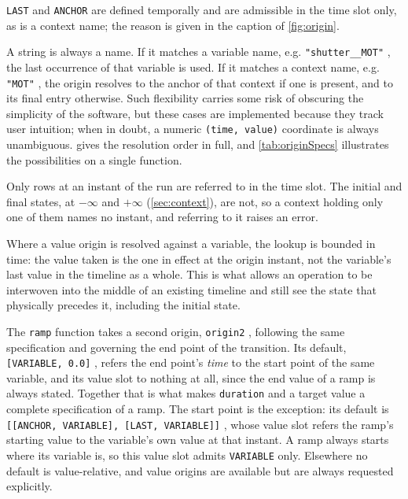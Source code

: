 \documentclass{SciPost}
\newcommand{\python}[1]{%
  \texttt{#1}%
}
\begin{document}
\begin{appendix}
\python{LAST} and \python{ANCHOR} are defined temporally and are admissible in the time slot only, as is a context name; the reason is given in the caption of \cref{fig:origin}.

A string is always a name. If it matches a variable name, e.g. \python{"shutter__MOT"}, the last occurrence of that variable is used. If it matches a context name, e.g. \python{"MOT"}, the origin resolves to the anchor of that context if one is present, and to its final entry otherwise. Such flexibility carries some risk of obscuring the simplicity of the software, but these cases are implemented because they track user intuition; when in doubt, a numeric \python{(time, value)} coordinate is always unambiguous.  gives the resolution order in full, and \cref{tab:originSpecs} illustrates the possibilities on a single function.

Only rows at an instant of the run are referred to in the time slot. The initial and final states, at $-\infty$ and $+\infty$ (\cref{sec:context}), are not, so a context holding only one of them names no instant, and referring to it raises an error.

Where a value origin is resolved against a variable, the lookup is bounded in time: the value taken is the one in effect at the origin instant, not the variable’s last value in the timeline as a whole. This is what allows an operation to be interwoven into the middle of an existing timeline and still see the state that physically precedes it, including the initial state.

The \python{ramp} function takes a second origin, \python{origin2}, following the same specification and governing the end point of the transition. Its default, \python{[VARIABLE, 0.0]}, refers the end point’s \emph{time} to the start point of the same variable, and its value slot to nothing at all, since the end value of a ramp is always stated. Together that is what makes \python{duration} and a target value a complete specification of a ramp. The start point is the exception: its default is \python{[[ANCHOR, VARIABLE], [LAST, VARIABLE]]}, whose value slot refers the ramp’s starting value to the variable’s own value at that instant. A ramp always starts where its variable is, so this value slot admits \python{VARIABLE} only. Elsewhere no default is value-relative, and value origins are available but are always requested explicitly.


\end{appendix}
\end{document}
